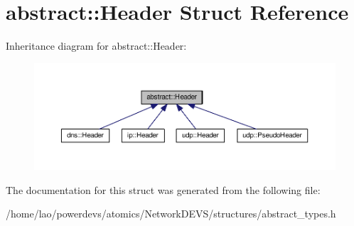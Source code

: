 \hypertarget{structabstract_1_1Header}{}\section{abstract\+:\+:Header Struct Reference}
\label{structabstract_1_1Header}


Inheritance diagram for abstract\+:\+:Header\+:\nopagebreak
\begin{figure}[H]
\begin{center}
\leavevmode
\includegraphics[width=350pt]{structabstract_1_1Header__inherit__graph}
\end{center}
\end{figure}


The documentation for this struct was generated from the following file\+:\begin{DoxyCompactItemize}
\item 
/home/lao/powerdevs/atomics/\+Network\+D\+E\+V\+S/structures/abstract\+\_\+types.\+h\end{DoxyCompactItemize}

